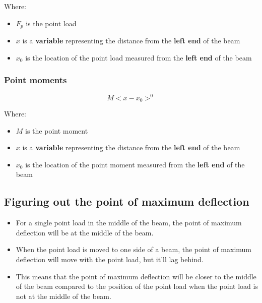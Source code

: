 \documentclass[11pt]{article}
\begin{document}
Where:
\begin{itemize}
\item \(F_p\) is the point load
\item \(x\) is a \textbf{variable} representing the distance from the \textbf{left end} of the beam
\item \(x_0\) is the location of the point load measured from the \textbf{left end} of the beam
\end{itemize}

\subsubsection{Point moments}
\label{sec:orgadab504}
\[M < x - x_0 >^0\]

Where:
\begin{itemize}
\item \(M\) is the point moment
\item \(x\) is a \textbf{variable} representing the distance from the \textbf{left end} of the beam
\item \(x_0\) is the location of the point moment measured from the \textbf{left end} of the beam
\end{itemize}

\subsection{Figuring out the point of maximum deflection}
\label{sec:orgf113768}
\begin{itemize}
\item For a single point load in the middle of the beam, the point of maximum deflection will be at the middle of the beam.
\item When the point load is moved to one side of a beam, the point of maximum deflection will move with the point load, but it'll lag behind.
\item This means that the point of maximum deflection will be closer to the middle of the beam compared to the position of the point load when the point load is not at the middle of the beam.
\end{itemize}

\newpage
\end{document}
